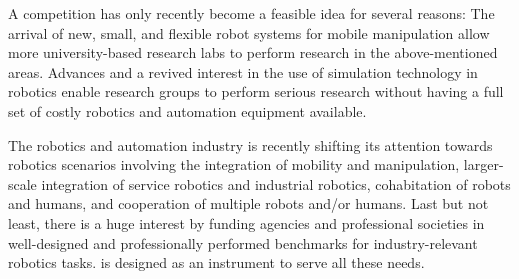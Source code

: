 A \RCAW competition has only recently become a feasible idea for several reasons: The arrival of new, small, and flexible robot systems for mobile manipulation allow more university-based research labs to perform research in the above-mentioned areas. Advances and a revived interest in the use of simulation technology in robotics enable research groups to perform serious research without having a full set of costly robotics and automation equipment available.
\par

The robotics and automation industry is recently shifting its attention towards robotics scenarios involving the integration of mobility and manipulation, larger-scale integration of service robotics and industrial robotics, cohabitation of robots and humans, and cooperation of multiple robots and/or humans. Last but not least, there is a huge interest by funding agencies and professional societies in well-designed and professionally performed benchmarks for industry-relevant robotics tasks. \RCAW is designed as an instrument to serve all these needs.
\par

